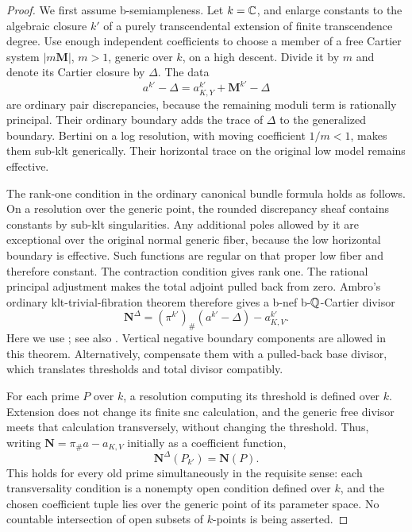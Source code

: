 \begin{proof}
We first assume b-semiampleness. Let \(k=\mathbb C\), and enlarge constants
to the algebraic closure \(k'\) of a purely transcendental extension
of finite transcendence degree. Use enough independent coefficients
to choose a member of a free Cartier system \(|m\mathbf M|\),
\(m>1\), generic over \(k\), on a high descent. Divide it by \(m\)
and denote its Cartier closure by \(\Delta\).
The data
\[
                       a^{k'}-\Delta
        =a_{K,Y}^{k'}+\mathbf M^{k'}-\Delta
\]
are ordinary pair discrepancies, because the remaining moduli term
is rationally principal. Their ordinary boundary adds the trace of
\(\Delta\) to the generalized boundary. Bertini on a log resolution,
with moving coefficient \(1/m<1\), makes them sub-klt generically.
Their horizontal trace on the original low model remains effective.

The rank-one condition in the ordinary canonical bundle formula
holds as follows. On a resolution over the generic point, the
rounded discrepancy sheaf contains constants by sub-klt singularities.
Any additional poles allowed by it are exceptional over the original
normal generic fiber, because the low horizontal boundary is
effective. Such functions are regular on that proper low fiber and
therefore constant. The contraction condition gives rank one.
The rational principal adjustment makes the total adjoint pulled back
from zero. Ambro's ordinary klt-trivial-fibration theorem therefore
gives a b-nef b-\(\mathbb Q\)-Cartier divisor
\[
 \mathbf N^\Delta
    =(\pi^{k'})_\#(a^{k'}-\Delta)-a_{K,V}^{k'}.
\]
Here we use \cite[Theorem 0.2]{AmbroBoundary}; see also
\cite{AmbroModuli}.
Vertical negative boundary components are allowed in this theorem.
Alternatively, compensate them with a pulled-back base divisor,
which translates thresholds and total divisor compatibly.

For each prime \(P\) over \(k\), a resolution computing its threshold
is defined over \(k\). Extension does not change its finite snc
calculation, and the generic free divisor meets that calculation
transversely, without changing the threshold. Thus, writing
\(\mathbf N=\pi_\#a-a_{K,V}\) initially as a coefficient function,
\begin{equation}\label{b:old-prime-equality}
                    \mathbf N^\Delta(P_{k'})=\mathbf N(P).
\end{equation}
This holds for every old prime simultaneously in the requisite sense:
each transversality condition is a nonempty open condition defined
over \(k\), and the chosen coefficient tuple lies over the generic
point of its parameter space. No countable intersection of open
subsets of \(k\)-points is being asserted.


\end{proof}
